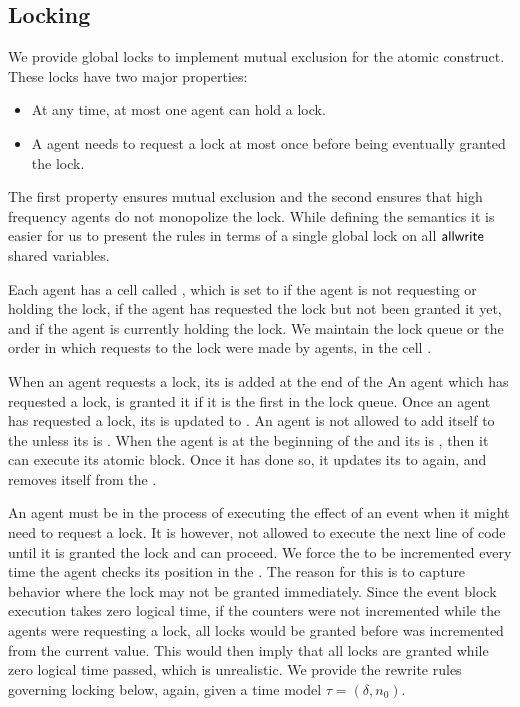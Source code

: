 \subsection[h]{Locking}
\label{sect:locking}
We provide global locks to implement mutual exclusion for the atomic construct. 
	These locks have two major properties:
    \begin{itemize}
\item At any time, at most one agent can hold a lock. 
\item A agent needs to request a lock at most once before being eventually granted the lock. 
\end{itemize}
The first property ensures mutual exclusion and the second ensures that high frequency agents do not monopolize the lock. 
While defining the semantics it is easier for us to present the rules in terms of a single global lock on all $\sf{allwrite}$ shared variables. 

Each agent has a cell called , which is set to  if the agent is not requesting or holding the lock,  if the agent has requested the lock but not been granted it yet, and  if the agent is currently holding the lock. We maintain the lock queue or the order in which requests to the lock were made by agents, in the cell . 

When an agent requests a lock, its  is added at the end of the  An agent which has requested a lock, is granted it if it is the first in the lock queue. Once an agent has requested a lock, its  is updated to . An agent is not allowed to add itself to the  unless its  is . When the agent is at the beginning of the  and its  is , then it can execute its atomic block. Once it has done so, it updates its  to  again, and removes itself from the . 

An agent must be in the process of executing the effect of an event when it might need to request a lock. It is however, not allowed to execute the next line of code until it is granted the lock and can proceed. We force the  to be incremented every time the agent checks its position in the . The reason for this is to capture behavior where the lock may not be granted immediately. Since the event block execution takes zero logical time, if the counters were not incremented while the agents were requesting a lock, all locks would be granted before  was incremented from the current value. This would then imply that all locks are granted while zero logical time passed, which is unrealistic. We provide the rewrite rules governing locking below, again, given a time model $\tau = (\delta,n_0)$. 


